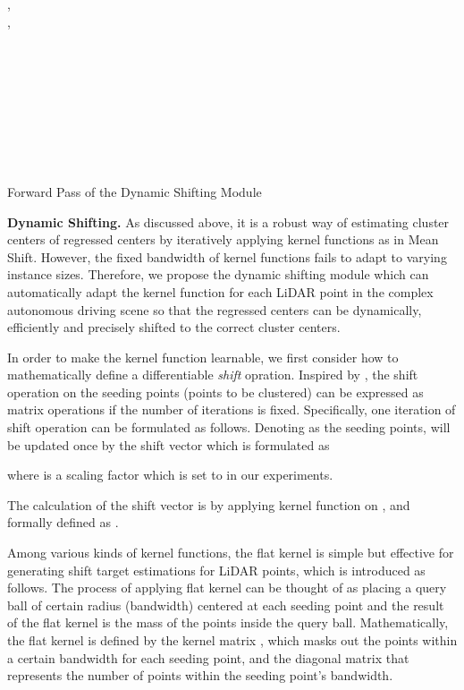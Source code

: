 \documentclass[final]{cvpr}
\begin{document}
 
\begin{algorithm}[ht]
    \SetAlgoLined
    ,  \label{algo:1} \\
    ,  \label{algo:2} \\
    \For{} { \label{algo:3}
        \\
\\
        \For{} {
            \\
            \\
            
        }
        \\
    } \label{algo:12}
     \label{algo:13} \\
     \label{algo:14} \\
     \label{algo:15} \\
    \Return 
    \caption{Forward Pass of the Dynamic Shifting Module}
    \label{algo:forward_pass}
\end{algorithm}
\setlength{\textfloatsep}{6pt} 
\noindent\textbf{Dynamic Shifting.}
As discussed above, it is a robust way of estimating cluster centers of regressed centers by iteratively
applying kernel functions as in Mean Shift.
However, the fixed bandwidth of kernel functions fails to adapt to varying instance sizes.
Therefore, we propose the dynamic shifting module which can automatically adapt the kernel function for
each LiDAR point in the complex autonomous driving scene so that the regressed centers can be dynamically,
efficiently and precisely shifted to the correct cluster centers.

In order to make the kernel function learnable, we first consider how to mathematically define a differentiable
\textit{shift} opration.
Inspired by \cite{kong2018recurrent}, the shift operation on the seeding points (\ie points to be clustered)
can be expressed as matrix operations if the number of iterations is fixed.
Specifically, one iteration of shift operation can be formulated as follows.
Denoting  as the  seeding points,  will be updated once
by the shift vector  which is formulated as

where  is a scaling factor which is set to  in our experiments.

The calculation of the shift vector  is by applying kernel function  on , and formally defined as
.

Among various kinds of kernel functions, the flat kernel is simple but effective for generating shift target
estimations for LiDAR points, which is introduced as follows.
The process of applying flat kernel can be thought of as placing a query ball of certain radius (\ie bandwidth) centered at each seeding
point and the result of the flat kernel is the mass of the points inside the query ball.
Mathematically, the flat kernel  is defined by the
kernel matrix , which masks out the points within a certain bandwidth  for each seeding point,
and the diagonal matrix  that represents the number of points within the seeding point's bandwidth.
\end{document}
